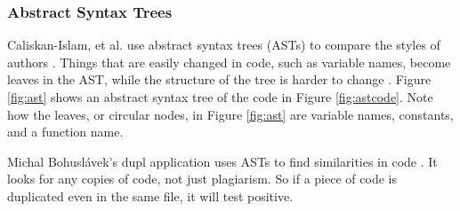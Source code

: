 \documentclass[journal,comsoc]{IEEEtran}
\begin{document}
			\subsubsection{Abstract Syntax Trees}
			Caliskan-Islam, et al. use abstract syntax trees (ASTs) to compare the styles of authors \cite{caliskan-islam+harang+liu}. Things that are easily changed in code, such as variable names, become leaves in the AST, while the structure of the tree is harder to change \cite{caliskan-islam+harang+liu}. Figure \ref{fig:ast} shows an abstract syntax tree of the code in Figure \ref{fig:astcode}. Note how the leaves, or circular nodes, in Figure \ref{fig:ast} are variable names, constants, and a function name.
		
			Michal Bohuslávek's dupl application uses ASTs to find similarities in code \cite{bohuslave}. It looks for any copies of code, not just plagiarism. So if a piece of code is duplicated even in the same file, it will test positive.
		
\end{document}
